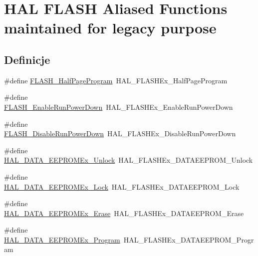 \hypertarget{group___h_a_l___f_l_a_s_h___aliased___functions}{}\section{H\+AL F\+L\+A\+SH Aliased Functions maintained for legacy purpose}
\label{group___h_a_l___f_l_a_s_h___aliased___functions}
\subsection*{Definicje}
\begin{DoxyCompactItemize}
\item 
\#define \hyperlink{group___h_a_l___f_l_a_s_h___aliased___functions_ga7f39eb32cad2b3a69edac9db280ae255}{F\+L\+A\+S\+H\+\_\+\+Half\+Page\+Program}~H\+A\+L\+\_\+\+F\+L\+A\+S\+H\+Ex\+\_\+\+Half\+Page\+Program
\item 
\#define \hyperlink{group___h_a_l___f_l_a_s_h___aliased___functions_ga59ea20f4333891430997c1f2516c8e75}{F\+L\+A\+S\+H\+\_\+\+Enable\+Run\+Power\+Down}~H\+A\+L\+\_\+\+F\+L\+A\+S\+H\+Ex\+\_\+\+Enable\+Run\+Power\+Down
\item 
\#define \hyperlink{group___h_a_l___f_l_a_s_h___aliased___functions_gad23696b2f516b4121e6f0fc4e162566c}{F\+L\+A\+S\+H\+\_\+\+Disable\+Run\+Power\+Down}~H\+A\+L\+\_\+\+F\+L\+A\+S\+H\+Ex\+\_\+\+Disable\+Run\+Power\+Down
\item 
\#define \hyperlink{group___h_a_l___f_l_a_s_h___aliased___functions_gaa1adfb208f775a74dd7796879403ff3f}{H\+A\+L\+\_\+\+D\+A\+T\+A\+\_\+\+E\+E\+P\+R\+O\+M\+Ex\+\_\+\+Unlock}~H\+A\+L\+\_\+\+F\+L\+A\+S\+H\+Ex\+\_\+\+D\+A\+T\+A\+E\+E\+P\+R\+O\+M\+\_\+\+Unlock
\item 
\#define \hyperlink{group___h_a_l___f_l_a_s_h___aliased___functions_gae482c56adea4a0ba4e5037ef28143b06}{H\+A\+L\+\_\+\+D\+A\+T\+A\+\_\+\+E\+E\+P\+R\+O\+M\+Ex\+\_\+\+Lock}~H\+A\+L\+\_\+\+F\+L\+A\+S\+H\+Ex\+\_\+\+D\+A\+T\+A\+E\+E\+P\+R\+O\+M\+\_\+\+Lock
\item 
\#define \hyperlink{group___h_a_l___f_l_a_s_h___aliased___functions_gadd129e009dd98c78912e328fc2aa370e}{H\+A\+L\+\_\+\+D\+A\+T\+A\+\_\+\+E\+E\+P\+R\+O\+M\+Ex\+\_\+\+Erase}~H\+A\+L\+\_\+\+F\+L\+A\+S\+H\+Ex\+\_\+\+D\+A\+T\+A\+E\+E\+P\+R\+O\+M\+\_\+\+Erase
\item 
\#define \hyperlink{group___h_a_l___f_l_a_s_h___aliased___functions_ga8460315cf3b1c92cc16cb13646845529}{H\+A\+L\+\_\+\+D\+A\+T\+A\+\_\+\+E\+E\+P\+R\+O\+M\+Ex\+\_\+\+Program}~H\+A\+L\+\_\+\+F\+L\+A\+S\+H\+Ex\+\_\+\+D\+A\+T\+A\+E\+E\+P\+R\+O\+M\+\_\+\+Program
\end{DoxyCompactItemize}


